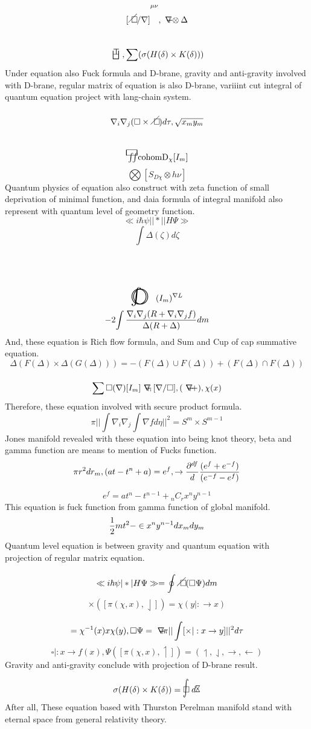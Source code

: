\documentclass{jsarticle}
\begin{document}
  $$ {[\alearletter / \nabla]}^{\mu\nu}, \secproduct \otimes \Delta $$
  $$ \dazanier, \sum(\sigma(H(\delta)\times K(\delta))) $$
  Under equation also Fuck formula and D-brane, gravity and anti-gravity
  involved with D-brane, regular matrix of equation is also D-brane,
  variiint cut integral of quantum equation project with lang-chain system.
  $$ \nabla_{i}\nabla_{j}(\square \times \alearletter)d\tau, \sqrt{x_m y_m} $$
  $$ \squareiint \mathrm{cohom D_{\chi}}[I_m] $$
  $$ \bigotimes [S_{D\chi} \otimes h\nu] $$
  Quantum physics of equation also construct with zeta function of small 
  deprivation of minimal function, and daia formula of integral manifold
  also represent with quantum level of geometry function.
  $$ \ll i\hbar \psi||\ast||H\Psi \gg $$
  $$ \int \Delta(\zeta)d\zeta $$
　$$\whitewithbodercircleint (I_m)^{\nabla L} $$
 $$ -2{\int {{\nabla_{i}\nabla_{j}(R + \nabla_{i}\nabla_{j} f)} \over
 {\Delta(R + \Delta)}}}dm $$
 And, these equation is Rich flow formula, and Sum and Cup of cap 
 summative equation.
 $$ \Delta (F(\Delta) \times \Delta(G(\Delta))) = -(F(\Delta)\cup F(\Delta))
 + (F(\Delta)\cap F(\Delta)) $$
 $$ \sum \square(\nabla)[I_m] \secproduct, [\nabla/ \square], (\secproduct +),
 \chi(x) $$
 Therefore, these equation involved with secure product formula.
 $$ \pi ||\int \nabla_{i}\nabla_{j} \int \nabla f d\eta||^{2} =
 S^{m} \times S^{m-1} $$
 Jones manifold revealed with these equation into being knot theory,
 beta and gamma function are means to mention of Fucks function. 
 $$\pi r^2 dr_m, (at - t^{n} + a) = e^{f}, \to {{\partial^{df} \over {d}}}
 {{(e^{f} + e^{-f})}\over {(e^{-f} - e^{f})}}$$
 
  $$ e^{f} = at^n - t^{n-1} + {}_n C_{r}x^n y^{n-1} $$
  This equation is fuck function from gamma function of global manifold.
  $$ {{1 \over 2}mt^2} - \in x^n y^{n-1}dx_mdy_m $$
  Quantum level equation is between gravity and quantum equation with
  projection of regular matrix equation.
  $$ \ll i\hbar \psi |\ast| H \Psi\gg = \oint \alearletter(\square \Psi)dm $$
  $$ \times([\pi(\chi,x),\downharpoonleft]) = \chi(y|:\to x) $$
  $$ = \chi^{-1}(x)x\chi(y), \square \Psi = \secproduct \pi||\int[\times|:
  x \to y]||^2d\tau $$
  $$ \square |:x \to f(x), \Psi([\pi(\chi,x),\upharpoonleft])
  = (\upharpoonleft,\downharpoonleft,\rightarrow,\leftarrow) $$
  Gravity and anti-gravity conclude with projection of D-brane result.
  $$ \sigma(H(\delta) \times K(\delta)) = \flowerletter d\timebow $$
  After all, These equation based with Thurston Perelman manifold
  stand with eternal space from general relativity theory.
\end{document}

